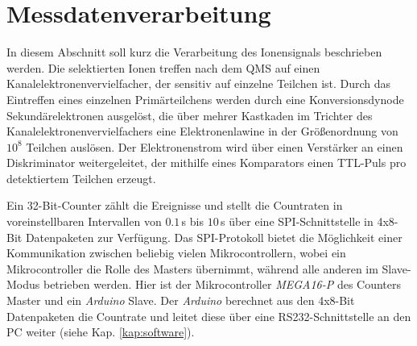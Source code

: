 \section{Messdatenverarbeitung}\label{sec:messdatenverarbeitung}
In diesem Abschnitt soll kurz die Verarbeitung des Ionensignals beschrieben
werden. Die selektierten Ionen treffen nach dem QMS auf einen
Kanalelektronenvervielfacher, der sensitiv auf einzelne Teilchen ist. Durch das
Eintreffen eines einzelnen Primärteilchens werden durch eine Konversionsdynode
Sekundärelektronen ausgelöst, die über mehrer Kastkaden im Trichter des
Kanalelektronenvervielfachers eine Elektronenlawine in der Größenordnung von
$10^8$ Teilchen auslösen. Der Elektronenstrom wird über einen Verstärker an
einen Diskriminator weitergeleitet, der mithilfe eines Komparators einen
TTL-Puls pro detektiertem Teilchen erzeugt.\par
Ein 32-Bit-Counter \cite{counterkarte_countraten} zählt die Ereignisse und
stellt die Countraten in voreinstellbaren Intervallen von $0.1\,$s bis $10\,$s
über eine SPI-Schnittstelle in 4x8-Bit Datenpaketen zur Verfügung. Das SPI-Protokoll bietet die Möglichkeit einer Kommunikation
zwischen beliebig vielen Mikrocontrollern, wobei ein Mikrocontroller die Rolle
des Masters übernimmt, während alle anderen im Slave-Modus betrieben werden.
Hier ist der Mikrocontroller \textit{MEGA16-P} des Counters Master und ein
\textit{Arduino} Slave. Der \textit{Arduino} berechnet aus den 4x8-Bit Datenpaketen die Countrate
und leitet diese über eine RS232-Schnittstelle an den PC weiter (siehe Kap.
\ref{kap:software}).

